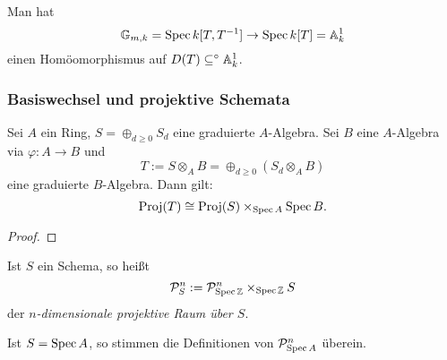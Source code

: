 \begin{bemerkung}
    Man hat 
    \[\mathbb{G}_{m,k}= \operatorname{Spec} k[T,T^{-1}] \to \operatorname{Spec} k[T] = \mathbb{A}^1_k\]
    einen Homöomorphismus auf $D(T) \subseteq^\circ \mathbb{A}^1_k$.
\end{bemerkung}

\subsubsection{Basiswechsel und projektive Schemata}
\begin{satz}
    Sei $A$ ein Ring, $S = \oplus_{d\geq 0} S_d$ eine graduierte $A$-Algebra.
    Sei $B$ eine $A$-Algebra via $\varphi:A\to B$ und 
    \[T:= S \otimes_A B = \oplus_{d\geq 0} (S_d \otimes_A B)\]
    eine graduierte $B$-Algebra. Dann gilt:
    \[ \operatorname{Proj}(T) \cong \operatorname{Proj}(S) \times_{\operatorname{Spec} A} \operatorname{Spec} B.\]
\end{satz}
\begin{proof}
\TODO
\end{proof}

\begin{definition}
    Ist $S$ ein Schema, so heißt
    \[\mathcal P^n_S := \mathcal P^n_{\operatorname{Spec} \mathbb{Z}} \times_{\operatorname{Spec} \mathbb{Z}} S\]
    der \emph{$n$-dimensionale projektive Raum über $S$}.
\end{definition}

\begin{bemerkung}
    Ist $S= \operatorname{Spec} A$, so stimmen die Definitionen
    von $\mathcal P^n_{\operatorname{Spec} A}$ überein.
\end{bemerkung}
